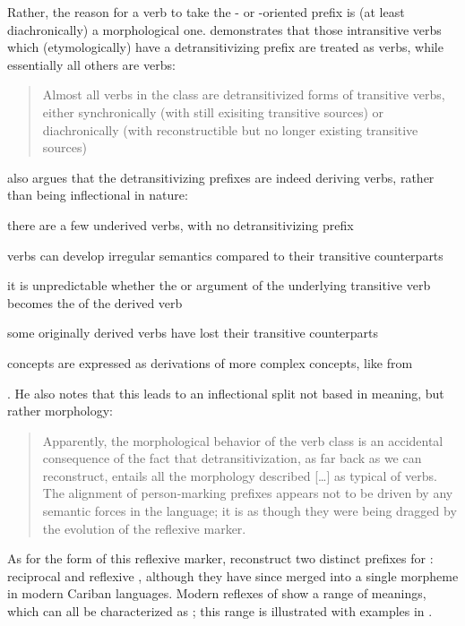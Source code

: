 Rather, the reason for a verb to take the - or -oriented prefix is (at least diachronically) a morphological one.
\textcite[217--221]{meira2000split} demonstrates that those intransitive verbs which (etymologically) have a detransitivizing prefix are treated as  verbs, while essentially all others are  verbs:
\begin{quotation}
Almost all verbs in the  class are detransitivized forms of transitive verbs, either synchronically (with still exisiting transitive sources) or diachronically (with reconstructible but no longer existing transitive sources) \parencite[201]{meira2000split}
\end{quotation}
\textcite[221--223]{meira2000split} also argues that the detransitivizing prefixes are indeed deriving  verbs, rather than being inflectional in nature:
\begin{inlinelist}
	\item there are a few underived  verbs, with no detransitivizing prefix
	\item {} verbs can develop irregular semantics compared to their transitive counterparts
	\item it is unpredictable whether the  or  argument of the underlying transitive verb becomes the  of the derived  verb
	\item some originally derived  verbs have lost their transitive counterparts
	\item {} concepts are expressed as derivations of more complex concepts, like  from 
\end{inlinelist}.
He also notes that this leads to an inflectional split not based in meaning, but rather morphology:

\begin{quotation}
Apparently, the morphological behavior of the  verb class is an accidental consequence of the fact that detransitivization, as far back as we can reconstruct, entails all the morphology described […] as typical of  verbs. The alignment of person-marking prefixes appears not to be driven by any semantic forces in the language; it is as though they were being dragged by the evolution of the reflexive marker. \parencite[226]{meira2000split}
\end{quotation}

As for the form of this reflexive marker, \textcite[505--512]{meira2010origin} reconstruct two distinct  prefixes for \PC: reciprocal  and reflexive , although they have since merged into a single morpheme in modern Cariban languages.
Modern reflexes of \detrz show a range of meanings, which can all be characterized as ; this range is illustrated with \trio examples in .

